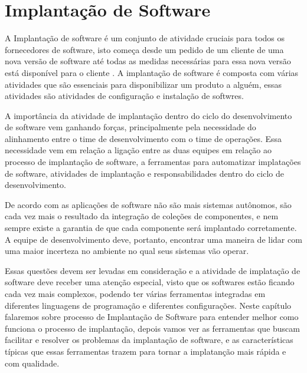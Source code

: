 

\section{Implantação de Software}

A Implantação de software é um conjunto de atividade cruciais para todos os fornecedores de
software, isto começa desde um pedido de um cliente de uma nova versão de software até todas
as medidas necessárias para essa nova versão está disponível para o cliente \cite{5741269}.
A implantação de software é composta com várias atividades que são essenciais para
disponibilizar um produto a alguém, essas atividades são atividades de configuração
e instalação de softwres.

A importância da atividade de implantação dentro do ciclo do desenvolvimento
de software vem ganhando forças, principalmente pela necessidade do alinhamento
entre o time de desenvolvimento com o time de operações. Essa necessidade vem em
relação a ligação entre as duas equipes em relação ao processo de implantação
de software, a ferramentas para automatizar implatações de software, atividades
de implantação e  responsabilidades dentro do ciclo de desenvolvimento.

De acordo com \cite{deployment1998} as aplicações de software não são mais
sistemas autônomos, são cada vez mais o resultado da integração de coleções de
componentes, e nem sempre existe a garantia de que cada componente será implantado
corretamente. A equipe de desenvolvimento deve, portanto, encontrar uma maneira de lidar
com uma maior incerteza no ambiente no qual seus sistemas vão operar.

Essas questões  devem ser levadas em consideração e a atividade de implatação de
software deve receber uma atenção especial, visto que os softwares estão ficando
cada vez mais complexos, podendo ter várias ferramentas integradas em diferentes
linguagens de programação e diferentes configurações. Neste capítulo falaremos
sobre processo de Implantação de Software para entender melhor como funciona o
processo de implantação, depois vamos ver as ferramentas que buscam facilitar e
resolver os problemas da implantação de software, e as características típicas que
essas ferramentas trazem para tornar a implatanção mais rápida e com qualidade.

